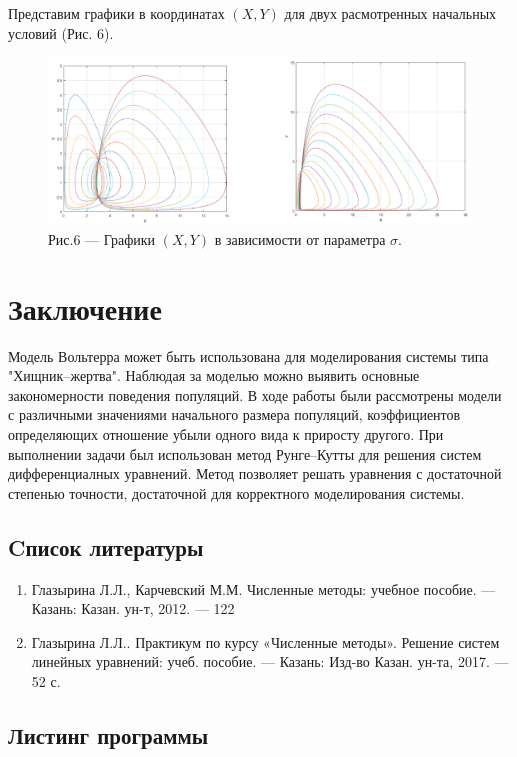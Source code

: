 \documentclass[a4paper,12pt]{article}
\begin{document}
Представим графики в координатах $(X, Y)$ для двух расмотренных начальных условий (Рис. 6).
\begin{figure}[h]
    \centering
    \includegraphics[width=1\linewidth]{pictures/task4.png}
    \captionsetup{labelformat=empty}
    \caption{Рис.6 --- Графики $(X, Y)$ в зависимости от параметра $\sigma$.}
\end{figure}

\newpage
\section{Заключение}
\hspace{0.5cm} Модель Вольтерра может быть использована для моделирования системы типа "Хищник--жертва".
Наблюдая за моделью можно выявить основные закономерности поведения популяций. В ходе работы были рассмотрены
модели с различными значениями начального размера популяций, коэффициентов определяющих отношение убыли 
одного вида к приросту другого. При выполнении задачи был использован метод Рунге--Кутты для решения систем 
дифференциалных уравнений. Метод позволяет решать уравнения с достаточной степенью точности, достаточной для 
корректного моделирования системы.
\newpage

\begin{center}
\section{Cписок литературы}
\end{center}
\begin{enumerate}
    \item Глазырина Л.Л., Карчевский М.М. Численные методы: учебное пособие. — Казань: Казан.
    ун-т, 2012. — 122 
    \item Глазырина Л.Л.. Практикум по курсу «Численные методы». Решение
    систем линейных уравнений: учеб. пособие. — Казань: Изд-во Казан. ун-та, 2017. — 52 с.
\end{enumerate}
\newpage

\begin{center}
\section{Листинг программы}
\end{center}

\end{document}
